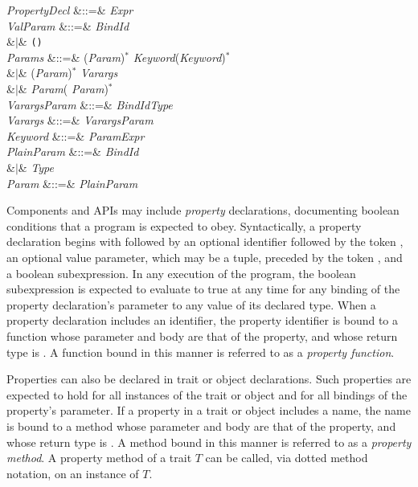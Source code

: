 \begin{Grammar}
\emph{PropertyDecl} &::=&  
 \emph{Expr} \\

\emph{ValParam} &::=& \emph{BindId}\\
&$|$& \texttt(\texttt)\\

\emph{Params}
&::=& (\emph{Param}\EXP{,})$^*$  \emph{Keyword}(\EXP{,}\emph{Keyword})$^*$\\
&$|$& (\emph{Param}\EXP{,})$^*$  \emph{Varargs}\\
&$|$& \emph{Param}(\EXP{,} \emph{Param})$^*$\\

\emph{VarargsParam} &::=& \emph{BindId}\EXP{\COLONOP}\emph{Type} \\

\emph{Varargs} &::=& \emph{VarargsParam}\\

\emph{Keyword} &::=& \emph{Param}\EXP{=}\emph{Expr} \\

\emph{PlainParam} &::=& \emph{BindId}  \\
&$|$& \emph{Type} \\

\emph{Param} &::=& \emph{PlainParam}\\

\end{Grammar}

Components and APIs may include \emph{property}
declarations, documenting
boolean conditions that a program is expected to obey.
Syntactically, a property declaration begins with
 followed by an optional identifier followed by the token
\EXP{=}, an optional value parameter, which may be a tuple, preceded by the
token \EXP{\forall}, and a boolean subexpression.
In any execution of the program, the boolean subexpression is expected to
evaluate to true at any time for any binding of the property declaration's
parameter to any value of its declared type.
When a property declaration includes an identifier,
the property identifier is bound to a function whose parameter
and body are that of the property, and whose return type is .
A function bound in this manner is referred to as a \emph{property function}.


Properties can also be declared in trait or object declarations. Such
properties are expected to hold for all instances of the trait or object
and for all bindings of the property's parameter. If a property in a trait
or object includes a name, the name is bound to a method whose parameter
and body are that of the property, and whose return type is
.
A method bound in this manner is referred to as a \emph{property
  method}. A property method of a trait $T$ can be called,
via dotted method notation, on an instance of $T$.

